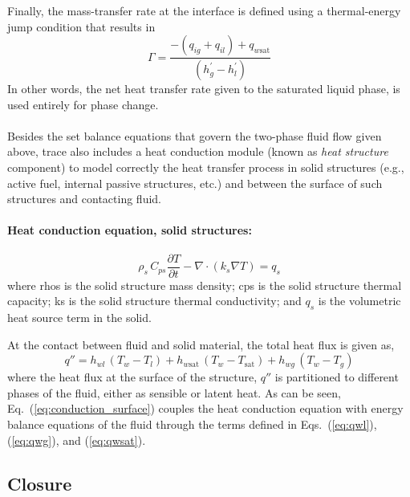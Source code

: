 Finally, the mass-transfer rate at the interface is defined using a thermal-energy jump condition that results in
\begin{equation}
	\Gamma = \frac{-(q_{ig} + q_{il}) + q_{w\text{sat}}}{(h^\prime_g - h^\prime_l)}
\label{eq:Gamma}
\end{equation}
In other words, the net heat transfer rate given to the saturated liquid phase, is used entirely for phase change.

\paragraph{}

Besides the set balance equations that govern the two-phase fluid flow given above,
\gls{trace} also includes a heat conduction module (known as \emph{heat structure} component) 
to model correctly the heat transfer process in solid structures (e.g., active fuel, internal passive structures, etc.) 
and between the surface of such structures and contacting fluid.
\paragraph{Heat conduction equation, solid structures:}
\begin{equation}
	\rho_s \, C_{ps} \frac{\partial T}{\partial t} - \nabla \cdot (k_s \nabla T) = q_s 
\label{eq:conduction}
\end{equation}
where \gls{rhos} is the solid structure mass density;
\gls{cps} is the solid structure thermal capacity;
\gls{ks} is the solid structure thermal conductivity;
and $q_s$ is the volumetric heat source term in the solid.

At the contact between fluid and solid material, the total heat flux is given as,
\begin{equation}
	q'' = h_{wl} \, (T_{w} - T_l) + h_{w\text{sat}} \, (T_w - T_\text{sat}) + h_{wg} \, (T_w - T_g)
\label{eq:conduction_surface}
\end{equation}
where the heat flux at the surface of the structure, $q''$ is partitioned to different phases of the fluid, either as sensible or latent heat.
As can be seen, 
Eq.~(\ref{eq:conduction_surface}) couples the heat conduction equation with energy balance equations of the fluid through the terms defined in Eqs.~(\ref{eq:qwl}), (\ref{eq:qwg}), and (\ref{eq:qwsat}).

\subsection{Closure}\label{sub:closure}